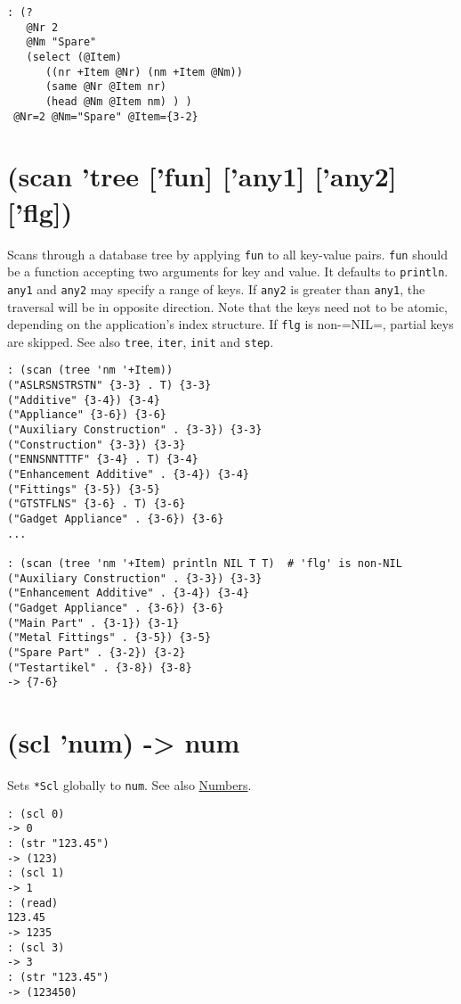 {{{{{{{{\begin{verbatim}
: (?
   @Nr 2
   @Nm "Spare"
   (select (@Item)
      ((nr +Item @Nr) (nm +Item @Nm))
      (same @Nr @Item nr)
      (head @Nm @Item nm) ) )
 @Nr=2 @Nm="Spare" @Item={3-2}
\end{verbatim}

 
\section{(scan 'tree ['fun] ['any1] ['any2] ['flg])}
\label{sec-8-1-19-8}


Scans through a database tree by applying \texttt{fun} to all key-value pairs.
\texttt{fun} should be a function accepting two arguments for key and value. It
defaults to \texttt{println}. \texttt{any1} and \texttt{any2} may specify a range of keys. If
\texttt{any2} is greater than \texttt{any1}, the traversal will be in opposite
direction. Note that the keys need not to be atomic, depending on the
application's index structure. If \texttt{flg} is non-=NIL=, partial keys are
skipped. See also \texttt{tree}, \texttt{iter}, \texttt{init} and \texttt{step}.


\begin{verbatim}
: (scan (tree 'nm '+Item))
("ASLRSNSTRSTN" {3-3} . T) {3-3}
("Additive" {3-4}) {3-4}
("Appliance" {3-6}) {3-6}
("Auxiliary Construction" . {3-3}) {3-3}
("Construction" {3-3}) {3-3}
("ENNSNNTTTF" {3-4} . T) {3-4}
("Enhancement Additive" . {3-4}) {3-4}
("Fittings" {3-5}) {3-5}
("GTSTFLNS" {3-6} . T) {3-6}
("Gadget Appliance" . {3-6}) {3-6}
...

: (scan (tree 'nm '+Item) println NIL T T)  # 'flg' is non-NIL
("Auxiliary Construction" . {3-3}) {3-3}
("Enhancement Additive" . {3-4}) {3-4}
("Gadget Appliance" . {3-6}) {3-6}
("Main Part" . {3-1}) {3-1}
("Metal Fittings" . {3-5}) {3-5}
("Spare Part" . {3-2}) {3-2}
("Testartikel" . {3-8}) {3-8}
-> {7-6}
\end{verbatim}

 
\section{(scl 'num) -> num}
\label{sec-8-1-19-9}


Sets \texttt{*Scl} globally to \texttt{num}. See also \hyperref[ref.html-num-io]{Numbers}.


\begin{verbatim}
: (scl 0)
-> 0
: (str "123.45")
-> (123)
: (scl 1)
-> 1
: (read)
123.45
-> 1235
: (scl 3)
-> 3
: (str "123.45")
-> (123450)
\end{verbatim}

}}}}}}}}
